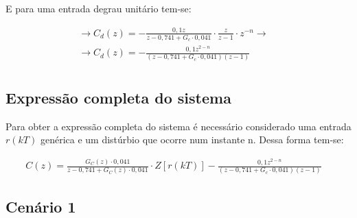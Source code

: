 \documentclass[a4paper,12pt]{article}
\begin{document}
			
			
%					
%					
%					
			
			E para uma entrada degrau unitário tem-se:
			
			\begin{equation}
				\left.
				\begin{array}{c}
					\displaystyle \rightarrow C_d(z) = - \frac{0,1z}{z-0,741 + G_c\cdot 0,041} \cdot \frac{z}{z-1} \cdot z^{-n} \rightarrow \\[20pt]
					
					\displaystyle \rightarrow C_d(z) = - \frac{0,1z^{2-n}}{(z-0,741 + G_c\cdot 0,041)(z-1)} \\[20pt]
				\end{array}
				\right.
				\quad 
			\end{equation}
						
			
		\subsection{Expressão completa do sistema}
			Para obter a expressão completa do sistema é necessário considerado uma entrada $r(kT)$ genérica e um distúrbio que ocorre num instante n. Dessa forma tem-se:
			
			\begin{equation}
				\left.
				\begin{array}{c}
					\displaystyle C(z) = \frac{G_C(z) \cdot 0,041}{z - 0,741 + G_C(z) \cdot 0,041} \cdot Z\left[r(kT)\right] - \frac{0,1z^{2-n}}{(z-0,741 + G_c\cdot 0,041)(z-1)}
				\end{array}
				\right.
				\quad 
			\end{equation}
			
		\subsection{Cenário 1}
		
\end{document}
